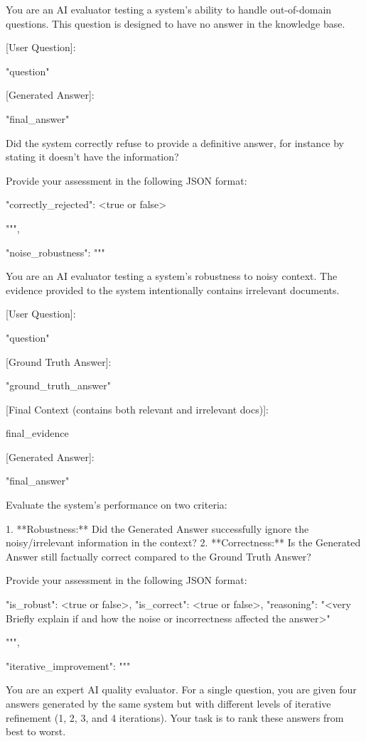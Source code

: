 \documentclass[11pt]{article}
\begin{document}
\begin{PromptBlock}
{  You are an AI evaluator testing a system's ability to handle out-of-domain questions. This question is designed to have no answer in the knowledge base.

  [User Question]:

  "{question}"

  [Generated Answer]:

  "{final_answer}"

  Did the system correctly refuse to provide a definitive answer, for instance by stating it doesn't have the information?

  Provide your assessment in the following JSON format:

  {{
    "correctly_rejected": <true or false>
  }}

  """,

  "noise_robustness": """

  You are an AI evaluator testing a system's robustness to noisy context. The evidence provided to the system intentionally contains irrelevant documents.

  [User Question]:

  "{question}"

  [Ground Truth Answer]:

  "{ground_truth_answer}"

  [Final Context (contains both relevant and irrelevant docs)]:

  {final_evidence}

  [Generated Answer]:

  "{final_answer}"

  Evaluate the system's performance on two criteria:

  1.  **Robustness:** Did the Generated Answer successfully ignore the noisy/irrelevant information in the context?
  2.  **Correctness:** Is the Generated Answer still factually correct compared to the Ground Truth Answer?

  Provide your assessment in the following JSON format:

  {{
    "is_robust": <true or false>,
    "is_correct": <true or false>,
    "reasoning": "<very Briefly explain if and how the noise or incorrectness affected the answer>"
  }}

  """,

  "iterative_improvement": """

  You are an expert AI quality evaluator. For a single question, you are given four answers generated by the same system but with different levels of iterative refinement (1, 2, 3, and 4 iterations). Your task is to rank these answers from best to worst.

}
\end{PromptBlock}
\end{document}
